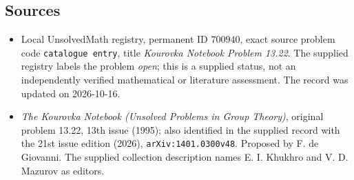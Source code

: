 \documentclass[11pt]{article}
\begin{document}
\subsection{Sources}
\begin{itemize}
\item Local UnsolvedMath registry, permanent ID \(700940\), exact source problem code \texttt{catalogue entry}, title \emph{Kourovka Notebook Problem 13.22}. The supplied registry labels the problem \emph{open}; this is a supplied status, not an independently verified mathematical or literature assessment. The record was updated on 2026-10-16.
\item \emph{The Kourovka Notebook (Unsolved Problems in Group Theory)}, original problem 13.22, 13th issue (1995); also identified in the supplied record with the 21st issue edition (2026), \texttt{arXiv:1401.0300v48}. Proposed by F. de Giovanni. The supplied collection description names E. I. Khukhro and V. D. Mazurov as editors.
\end{itemize}
\end{document}
